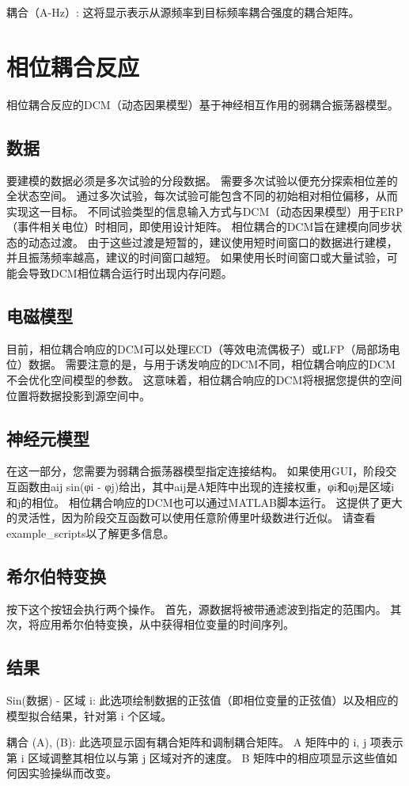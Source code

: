 耦合（A-Hz）:
这将显示表示从源频率到目标频率耦合强度的耦合矩阵。


\section{相位耦合反应}

相位耦合反应的DCM（动态因果模型）基于神经相互作用的弱耦合振荡器模型。


\subsection{数据}

要建模的数据必须是多次试验的分段数据。
需要多次试验以便充分探索相位差的全状态空间。
通过多次试验，每次试验可能包含不同的初始相对相位偏移，从而实现这一目标。
不同试验类型的信息输入方式与DCM（动态因果模型）用于ERP（事件相关电位）时相同，即使用设计矩阵。
相位耦合的DCM旨在建模向同步状态的动态过渡。
由于这些过渡是短暂的，建议使用短时间窗口的数据进行建模，并且振荡频率越高，建议的时间窗口越短。
如果使用长时间窗口或大量试验，可能会导致DCM相位耦合运行时出现内存问题。


\subsection{电磁模型}

目前，相位耦合响应的DCM可以处理ECD（等效电流偶极子）或LFP（局部场电位）数据。
需要注意的是，与用于诱发响应的DCM不同，相位耦合响应的DCM不会优化空间模型的参数。
这意味着，相位耦合响应的DCM将根据您提供的空间位置将数据投影到源空间中。


\subsection{神经元模型}

在这一部分，您需要为弱耦合振荡器模型指定连接结构。
如果使用GUI，阶段交互函数由aij sin(φi - φj)给出，其中aij是A矩阵中出现的连接权重，φi和φj是区域i和j的相位。
相位耦合响应的DCM也可以通过MATLAB脚本运行。
这提供了更大的灵活性，因为阶段交互函数可以使用任意阶傅里叶级数进行近似。
请查看example\_scripts以了解更多信息。


\subsection{希尔伯特变换}

按下这个按钮会执行两个操作。
首先，源数据将被带通滤波到指定的范围内。
其次，将应用希尔伯特变换，从中获得相位变量的时间序列。


\subsection{结果}

Sin(数据) - 区域 i:
此选项绘制数据的正弦值（即相位变量的正弦值）以及相应的模型拟合结果，针对第 i 个区域。

耦合 (A), (B):
此选项显示固有耦合矩阵和调制耦合矩阵。
A 矩阵中的 i, j 项表示第 i 区域调整其相位以与第 j 区域对齐的速度。
B 矩阵中的相应项显示这些值如何因实验操纵而改变。